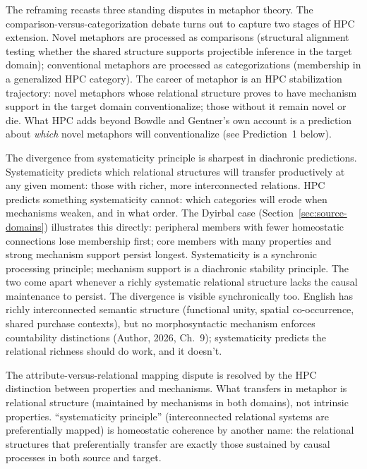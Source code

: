 \documentclass[12pt]{article}
\begin{document}
The reframing recasts three standing disputes in metaphor theory. The comparison-versus-categorization debate \citep{gentner1983, glucksberg2001} turns out to capture two stages of HPC extension. Novel metaphors are processed as comparisons (structural alignment testing whether the shared structure supports projectible inference in the target domain); conventional metaphors are processed as categorizations (membership in a generalized HPC category). The career of metaphor \citep{bowdle2005} is an HPC stabilization trajectory: novel metaphors whose relational structure proves to have mechanism support in the target domain conventionalize; those without it remain novel or die. What HPC adds beyond Bowdle and Gentner's own account is a prediction about \emph{which} novel metaphors will conventionalize (see Prediction~1 below).

The divergence from  systematicity principle is sharpest in diachronic predictions. Systematicity predicts which relational structures will transfer productively at any given moment: those with richer, more interconnected relations. HPC predicts something systematicity cannot: which categories will erode when mechanisms weaken, and in what order. The Dyirbal case (Section~\ref{sec:source-domains}) illustrates this directly: peripheral members with fewer homeostatic connections lose membership first; core members with many properties and strong mechanism support persist longest. Systematicity is a synchronic processing principle; mechanism support is a diachronic stability principle. The two come apart whenever a richly systematic relational structure lacks the causal maintenance to persist. The divergence is visible synchronically too. English  has richly interconnected semantic structure (functional unity, spatial co-occurrence, shared purchase contexts), but no morphosyntactic mechanism enforces countability distinctions (Author, 2026, Ch.~9); systematicity predicts the relational richness should do work, and it doesn't.

The attribute-versus-relational mapping dispute \citep{murphy1996, gentner1983} is resolved by the HPC distinction between properties and mechanisms. What transfers in metaphor is relational structure (maintained by mechanisms in both domains), not intrinsic properties. \textcite[163]{gentner1983} \enquote{systematicity principle} (interconnected relational systems are preferentially mapped) is homeostatic coherence by another name: the relational structures that preferentially transfer are exactly those sustained by causal processes in both source and target.
\end{document}
